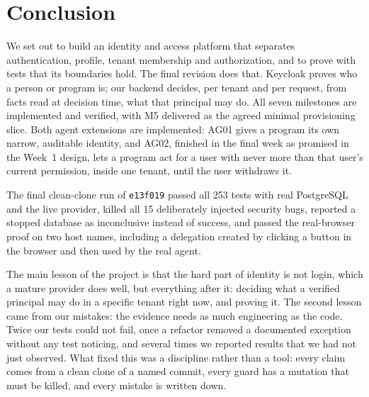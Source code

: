 \section{Conclusion}
\label{sec:conclusion}

We set out to build an identity and access platform that separates authentication, profile, tenant membership and authorization, and to prove with tests that its boundaries hold. The final revision does that. Keycloak proves who a person or program is; our backend decides, per tenant and per request, from facts read at decision time, what that principal may do. All seven milestones are implemented and verified, with M5 delivered as the agreed minimal provisioning slice. Both agent extensions are implemented: AG01 gives a program its own narrow, auditable identity, and AG02, finished in the final week as promised in the Week~1 design, lets a program act for a user with never more than that user's current permission, inside one tenant, until the user withdraws it.

The final clean-clone run of \texttt{e13f019} passed all 253 tests with real PostgreSQL and the live provider, killed all 15 deliberately injected security bugs, reported a stopped database as inconclusive instead of success, and passed the real-browser proof on two host names, including a delegation created by clicking a button in the browser and then used by the real agent.

The main lesson of the project is that the hard part of identity is not login, which a mature provider does well, but everything after it: deciding what a verified principal may do in a specific tenant right now, and proving it. The second lesson came from our mistakes: the evidence needs as much engineering as the code. Twice our tests could not fail, once a refactor removed a documented exception without any test noticing, and several times we reported results that we had not just observed. What fixed this was a discipline rather than a tool: every claim comes from a clean clone of a named commit, every guard has a mutation that must be killed, and every mistake is written down.
